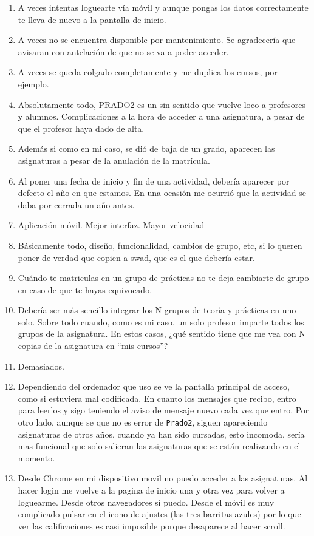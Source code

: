\begin{enumerate}
\item A veces intentas loguearte vía móvil y aunque pongas los datos correctamente te lleva de nuevo a la pantalla de inicio.
\item A veces no se encuentra disponible por mantenimiento. Se agradecería que avisaran con antelación de que no se va a poder acceder.
\item A veces se queda colgado completamente y me duplica los cursos, por ejemplo.
\item Absolutamente todo, PRADO2 es un sin sentido que vuelve loco a profesores y alumnos. Complicaciones a la hora de acceder a una asignatura, a pesar de que el profesor haya dado de alta.
\item Además si como en mi caso, se dió de baja de un grado, aparecen las asignaturas a pesar de la anulación de la matrícula.
\item Al poner una fecha de inicio y fin de una actividad, debería aparecer por defecto el año en que estamos. En una ocasión me ocurrió que la actividad se daba por cerrada un año antes.
\item Aplicación móvil. Mejor interfaz. Mayor velocidad
\item Básicamente todo, diseño, funcionalidad, cambios de grupo, etc, si lo queren poner de verdad que copien a swad, que es el que debería estar.
\item Cuándo te matriculas en un grupo de prácticas no te deja cambiarte de grupo en caso de que te hayas equivocado.
\item Debería ser más sencillo integrar los N grupos de teoría y prácticas en uno solo. Sobre todo cuando, como es mi caso, un solo profesor imparte todos los grupos de la asignatura. En estos casos, ¿qué sentido tiene que me vea con N copias de la asignatura en ``mis cursos''?
\item Demasiados.
\item Dependiendo del ordenador que uso se ve la pantalla principal de acceso, como si estuviera mal codificada. En cuanto los mensajes que recibo, entro para leerlos y sigo teniendo el aviso de mensaje nuevo cada vez que entro. Por otro lado, aunque se que no es error de \texttt{Prado2}, siguen apareciendo asignaturas de otros años, cuando ya han sido cursadas, esto incomoda, sería mas funcional que solo salieran las asignaturas que se están realizando en el momento.
\item Desde Chrome en mi dispositivo movil no puedo acceder a las asignaturas. Al hacer login me vuelve a la pagina de inicio una y otra vez para volver a loguearme. Desde otros navegadores sí puedo. Desde el móvil es muy complicado pulsar en el icono de ajustes (las tres barritas azules) por lo que ver las calificaciones es casi imposible porque desaparece al hacer scroll.

\end{enumerate}
